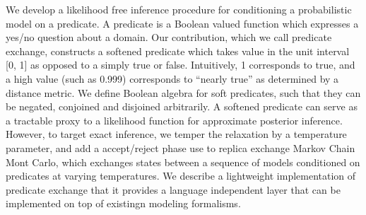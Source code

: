 We develop a likelihood free inference procedure for conditioning a probabilistic model on a predicate.
A predicate is a Boolean valued function which expresses a yes/no question about a domain.
Our contribution, which we call predicate exchange, 
constructs a softened predicate which takes value in the unit interval [0, 1] as opposed to a simply true or false. Intuitively, 1 corresponds to true, and a high value (such as 0.999) corresponds to ``nearly true'' as determined by a distance metric.
We define Boolean algebra for soft predicates,  such that they can be negated, conjoined and disjoined arbitrarily.
A softened predicate can serve as a tractable proxy to a likelihood function for approximate posterior inference.
However, to target exact inference, we temper the relaxation by a temperature parameter, and add a accept/reject phase use to replica exchange Markov Chain Mont Carlo, which exchanges states between a sequence of models conditioned on predicates at varying temperatures.
We describe a lightweight implementation of predicate exchange that it provides a language independent layer that can be implemented on top of existingn modeling formalisms.